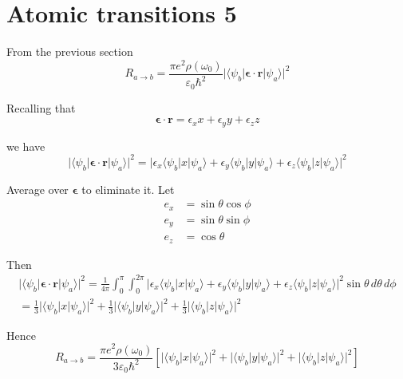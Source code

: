 

\section*{Atomic transitions 5}

From the previous section
\begin{equation*}
R_{a\rightarrow b}
=\frac{\pi e^2\rho(\omega_0)}{\varepsilon_0\hbar^2}
\bigl|\langle\psi_b|\boldsymbol{\epsilon}\cdot\mathbf r|\psi_a\rangle\bigr|^2
\end{equation*}

Recalling that
\begin{equation*}
\boldsymbol{\epsilon}\cdot\mathbf r=\epsilon_xx+\epsilon_yy+\epsilon_zz
\end{equation*}

we have
\begin{equation*}
\bigl|\langle\psi_b|\boldsymbol{\epsilon}\cdot\mathbf r|\psi_a\rangle\bigr|^2
=\bigl|
\epsilon_x\langle\psi_b|x|\psi_a\rangle
+\epsilon_y\langle\psi_b|y|\psi_a\rangle
+\epsilon_z\langle\psi_b|z|\psi_a\rangle
\bigr|^2
\end{equation*}

Average over $\boldsymbol\epsilon$ to eliminate it.
Let
\begin{align*}
e_x&=\sin\theta\cos\phi
\\
e_y&=\sin\theta\sin\phi
\\
e_z&=\cos\theta
\end{align*}

Then
\begin{multline*}
\bigl|\langle\psi_b|\boldsymbol{\epsilon}\cdot\mathbf r|\psi_a\rangle\bigr|^2
=\frac{1}{4\pi}\int_0^\pi\int_0^{2\pi}
\bigl|
\epsilon_x\langle\psi_b|x|\psi_a\rangle
+\epsilon_y\langle\psi_b|y|\psi_a\rangle
+\epsilon_z\langle\psi_b|z|\psi_a\rangle
\bigr|^2\sin\theta\,d\theta\,d\phi
\\
=\tfrac{1}{3}\bigl|\langle\psi_b|x|\psi_a\rangle\bigr|^2
+\tfrac{1}{3}\bigl|\langle\psi_b|y|\psi_a\rangle\bigr|^2
+\tfrac{1}{3}\bigl|\langle\psi_b|z|\psi_a\rangle\bigr|^2
\tag{1}
\end{multline*}

Hence
\begin{equation*}
R_{a\rightarrow b}
=\frac{\pi e^2\rho(\omega_0)}{3\varepsilon_0\hbar^2}
\left[
\bigl|\langle\psi_b|x|\psi_a\rangle\bigr|^2
+\bigl|\langle\psi_b|y|\psi_a\rangle\bigr|^2
+\bigl|\langle\psi_b|z|\psi_a\rangle\bigr|^2
\right]
\end{equation*}


